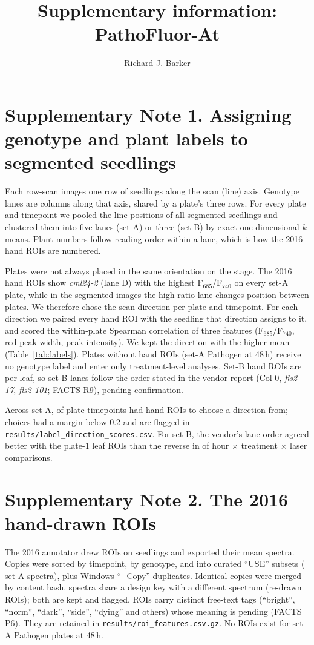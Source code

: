 \documentclass[11pt,a4paper]{article}
\title{\bfseries Supplementary information: PathoFluor-At}
\author{Richard J. Barker}
\date{}
\begin{document}
\maketitle

\section*{Supplementary Note 1. Assigning genotype and plant labels to segmented seedlings}
Each row-scan images one row of seedlings along the scan (line) axis. Genotype lanes are
columns along that axis, shared by a plate's three rows. For every plate and timepoint we pooled
the line positions of all segmented seedlings and clustered them into five lanes (set A) or
three (set B) by exact one-dimensional $k$-means. Plant numbers follow reading order within a
lane, which is how the 2016 hand ROIs are numbered.

Plates were not always placed in the same orientation on the stage. The 2016 hand ROIs show
\textit{cml24-2} (lane D) with the highest F$_{685}$/F$_{740}$ on every set-A plate, while in
the segmented images the high-ratio lane changes position between plates. We therefore chose
the scan direction per plate and timepoint. For each direction we paired every hand ROI with
the seedling that direction assigns to it, and scored the within-plate Spearman correlation of
three features (F$_{685}$/F$_{740}$, red-peak width, peak intensity). We kept the direction with
the higher mean (Table~\ref{tab:labels}). Plates without hand ROIs (set-A Pathogen at 48\,h)
receive no genotype label and enter only treatment-level analyses. Set-B hand ROIs are per leaf,
so set-B lanes follow the order stated in the vendor report (Col-0, \textit{fls2-17},
\textit{fls2-101}; FACTS R9), pending confirmation.

Across set A, \labPlates{} of \labPlatesAll{} plate-timepoints had hand ROIs to choose a direction
from; \labLowConf{} choices had a margin below 0.2 and are flagged in
\texttt{results/label\_direction\_scores.csv}. For set B, the vendor's lane order agreed better
with the plate-1 leaf ROIs than the reverse in \setBdirWins{} of \setBdirN{} hour $\times$
treatment $\times$ laser comparisons.



\section*{Supplementary Note 2. The 2016 hand-drawn ROIs}
The 2016 annotator drew ROIs on seedlings and exported their mean spectra. Copies were sorted by
timepoint, by genotype, and into curated ``USE'' subsets (\nUseSubset{} set-A spectra), plus
\nCopyFiles{} Windows ``- Copy'' duplicates. Identical copies were merged by content hash.
\nKeyConflict{} spectra share a design key with a different spectrum (re-drawn ROIs); both are
kept and flagged. ROIs carry \nTagValues{} distinct free-text tags (``bright'', ``norm'',
``dark'', ``side'', ``dying'' and others) whose meaning is pending (FACTS P6). They are retained
in \texttt{results/roi\_features.csv.gz}. No ROIs exist for set-A Pathogen plates at 48\,h.
\end{document}
